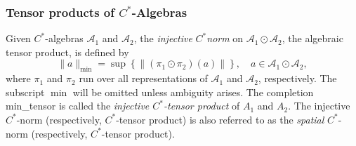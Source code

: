 \subsubsection{Tensor products of $C^*$-Algebras}


\begin{definition} \label{def:min_tensor_c*}
  Given $C^*$-algebras $\mathscr{A}_1$ and $\mathscr{A}_2$, the \emph{injective} $C^*$\emph{norm} on $\mathscr{A}_1 \odot \mathscr{A}_2$, the algebraic tensor product, is defined by
\[
\|a\|_{\min} = \sup \left\{ \|(\pi_1 \odot \pi_2)(a)\| \right\},
\quad a \in \mathscr{A}_1 \odot \mathscr{A}_2,
\]
where $\pi_1$ and $\pi_2$ run over all  representations of $\mathscr{A}_1$ and $\mathscr{A}_2$, respectively. The subscript $\min$  will be omitted unless ambiguity arises.
The completion \gls{min_tensor} is called the \emph{injective $C^*$-tensor product} of $A_1$ and $A_2$. The injective  $C^*$-norm (respectively, $C^*$-tensor product) is also referred to as the \emph{spatial}  $C^*$-norm (respectively, $C^*$-tensor product).
\end{definition}

